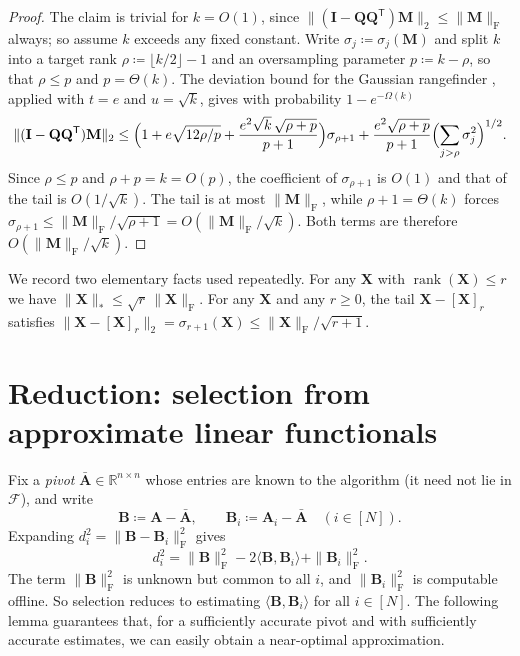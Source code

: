 \documentclass{article}
\renewcommand{\vec}[1]{\mathbf{#1}}          %
\newcommand{\T}{\mathsf{T}}                  %
\newcommand{\F}{\mathrm{F}}                  %
\newcommand{\cF}{\mathcal{F}}
\newcommand{\inner}[2]{\langle #1, #2 \rangle}
\DeclareMathOperator{\rank}{rank}
\theoremstyle{remark}
\begin{document}
\begin{proof}
The claim is trivial for $k = O(1)$, since $\|(\vec{I} - \vec{Q}\vec{Q}^\T)\vec{M}\|_2 \le \|\vec{M}\|_\F$ always; so assume $k$ exceeds any fixed constant.
Write $\sigma_j \coloneqq \sigma_j(\vec M)$ and split $k$ into a target rank $\rho \coloneqq \lfloor k/2\rfloor - 1$ and an oversampling parameter $p \coloneqq k - \rho$, so that $\rho \le p$ and $p = \Theta(k)$.
The deviation bound for the Gaussian rangefinder \cite[Thm.~10.8]{HMT11}, applied with $t = e$ and $u = \sqrt k$, gives with probability $1 - e^{-\Omega(k)}$
\[
\|(\vec{I} - \vec{Q}\vec{Q}^\T)\vec{M}\|_2
\le \Bigl( 1 + e\sqrt{12\rho/p} + \frac{e^2 \sqrt{k}\,\sqrt{\rho+p}}{p+1} \Bigr) \sigma_{\rho+1}
+ \frac{e^2 \sqrt{\rho + p}}{p+1} \Bigl( \sum_{j > \rho} \sigma_j^2 \Bigr)^{1/2}.
\]
Since $\rho \le p$ and $\rho + p = k = O(p)$, the coefficient of $\sigma_{\rho+1}$ is $O(1)$ and that of the tail is $O(1/\sqrt k)$.
The tail is at most $\|\vec M\|_\F$, while $\rho + 1 = \Theta(k)$ forces $\sigma_{\rho+1} \le \|\vec{M}\|_\F/\sqrt{\rho+1} = O(\|\vec M\|_\F/\sqrt k)$.
Both terms are therefore $O(\|\vec M\|_\F/\sqrt k)$.
\end{proof}

We record two elementary facts used repeatedly.
For any $\vec{X}$ with $\rank(\vec{X}) \le r$ we have $\|\vec{X}\|_* \le \sqrt{r}\,\|\vec{X}\|_\F$.
For any $\vec{X}$ and any $r \ge 0$, the tail $\vec{X} - [\vec{X}]_r$ satisfies $\|\vec{X} - [\vec{X}]_r\|_2 = \sigma_{r+1}(\vec{X}) \le \|\vec{X}\|_\F / \sqrt{r+1}$.

\section{Reduction: selection from approximate linear functionals}\label{sec:reduction}

Fix a \emph{pivot} $\bar{\vec{A}} \in \mathbb{R}^{n \times n}$ whose entries are known to the algorithm (it need not lie in $\cF$), and write
\[
\vec{B} \coloneqq \vec{A} - \bar{\vec{A}},
\qquad
\vec{B}_i \coloneqq \vec{A}_i - \bar{\vec{A}} \quad (i \in [N]).
\]
Expanding $d_i^2 = \|\vec{B} - \vec{B}_i\|_\F^2$ gives
\begin{equation}\label{eq:decomp}
d_i^2 = \|\vec{B}\|_\F^2 - 2\inner{\vec{B}}{\vec{B}_i} + \|\vec{B}_i\|_\F^2 .
\end{equation}
The term $\|\vec{B}\|_\F^2$ is unknown but common to all $i$, and $\|\vec{B}_i\|_\F^2$ is computable offline.
So selection reduces to estimating $\inner{\vec{B}}{\vec{B}_i}$ for all $i \in [N]$.
The following lemma guarantees that, for a sufficiently accurate pivot and with sufficiently accurate estimates, we can easily obtain a near-optimal approximation.
\end{document}
